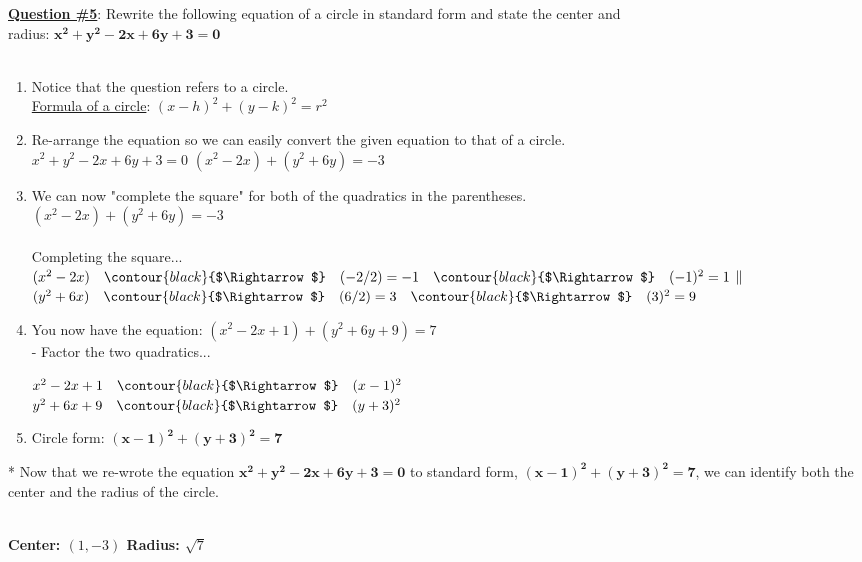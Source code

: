 \documentclass[11pt]{article}
\title{\centering{\large{\textbf{AP Calculus}: Weekly Problem Set \#1}}}
\author{Evan Huang}
\date{09/28/20}
\newcommand{\rArrow}{\quad\contour{black}{$\Rightarrow$}\quad}
\begin{document}
    
    \maketitle

    \textbf{\uline{Question \#5}}:   Rewrite the following equation of a circle in standard form and state the center and \\radius: ${\mathbf{x^2 + y^2 - 2x + 6y + 3 = 0}}$ \\~\\
    
    
    \small{ %
        \begin{enumerate}\bfseries\setlength\itemsep{2em}
            \item Notice that the question refers to a circle.\\
                \uline {Formula of a circle}: ${(x-h)^2 + (y-k)^2 = r^2}$
            
            \item Re-arrange the equation so we can easily convert the given equation to that of a circle.\\
                ${x^2 + y^2 - 2x + 6y + 3 = 0}$ \rArrow ${(x^2 -2x) + (y^2 +6y) = -3}$
            
            \item We can now "complete the square" for both of the quadratics in the parentheses.\\
                ${(x^2 -2x) + (y^2 +6y) = -3}$\\~\\
                Completing the square...\\
                $(x^2 - 2x) \rArrow (-2/2) = -1 \rArrow (-1)^2 = 1$ 
                $\space\|\space$
                $(y^2 + 6x) \rArrow (6/2) = 3 \rArrow (3)^2 = 9$
                
            \item You now have the equation: ${(x^2 - 2x + 1) + (y^2 + 6y + 9) = 7}$\\[0.5cm]
                - Factor the two quadratics...
                
                \quad ${x^2 - 2x + 1 \rArrow (x - 1)^2}$\\
                \quad ${y^2 + 6x + 9 \rArrow (y + 3)^2}$
            
            \item Circle form: $\mathbf{(x-1)^2 + (y + 3)^2 = 7}$
        \end{enumerate}
    }
    
    \normalsize {* Now that we re-wrote the equation ${\mathbf{x^2 + y^2 - 2x + 6y + 3 = 0}}$ to standard form, $\mathbf{{(x-1)^2 + (y + 3)^2 = 7}}$, we can identify both the center and the radius of the circle.}\\~\\
    
    \centerline{\textbf{Center: ${(1, -3)}$ \qquad Radius: ${\sqrt{7}}$}}
    
\end{document}
